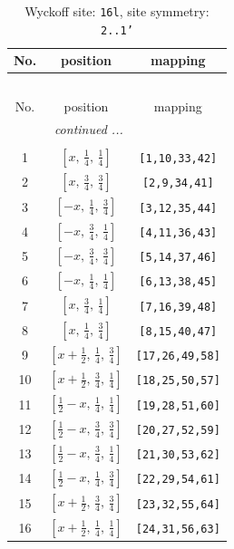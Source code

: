 \documentclass[fleqn,8pt]{jsarticle}
\begin{document}
\renewcommand{\arraystretch}{1.2}
\begin{longtable}{ccc}
\caption{Wyckoff site: {\tt 16l}, site symmetry: {\tt 2..1'}}
 \\
 \hline \hline
No. & position & mapping \\ \hline \endfirsthead

\multicolumn{2}{l}{\tablename\ \thetable{}} \\
 \hline \hline
No. & position & mapping \\ \hline \endhead

 \hline \hline
\multicolumn{2}{r}{\footnotesize\it continued ...} \\ \endfoot

 \hline \hline
\multicolumn{2}{r}{} \\ \endlastfoot

1 & $\left[ x,\, \frac{1}{4},\, \frac{1}{4} \right]$ & {\tt [1,10,33,42]} \\ \hline
2 & $\left[ x,\, \frac{3}{4},\, \frac{3}{4} \right]$ & {\tt [2,9,34,41]} \\ \hline
3 & $\left[ - x,\, \frac{1}{4},\, \frac{3}{4} \right]$ & {\tt [3,12,35,44]} \\ \hline
4 & $\left[ - x,\, \frac{3}{4},\, \frac{1}{4} \right]$ & {\tt [4,11,36,43]} \\ \hline
5 & $\left[ - x,\, \frac{3}{4},\, \frac{3}{4} \right]$ & {\tt [5,14,37,46]} \\ \hline
6 & $\left[ - x,\, \frac{1}{4},\, \frac{1}{4} \right]$ & {\tt [6,13,38,45]} \\ \hline
7 & $\left[ x,\, \frac{3}{4},\, \frac{1}{4} \right]$ & {\tt [7,16,39,48]} \\ \hline
8 & $\left[ x,\, \frac{1}{4},\, \frac{3}{4} \right]$ & {\tt [8,15,40,47]} \\ \hline
9 & $\left[ x + \frac{1}{2},\, \frac{1}{4},\, \frac{3}{4} \right]$ & {\tt [17,26,49,58]} \\ \hline
10 & $\left[ x + \frac{1}{2},\, \frac{3}{4},\, \frac{1}{4} \right]$ & {\tt [18,25,50,57]} \\ \hline
11 & $\left[ \frac{1}{2} - x,\, \frac{1}{4},\, \frac{1}{4} \right]$ & {\tt [19,28,51,60]} \\ \hline
12 & $\left[ \frac{1}{2} - x,\, \frac{3}{4},\, \frac{3}{4} \right]$ & {\tt [20,27,52,59]} \\ \hline
13 & $\left[ \frac{1}{2} - x,\, \frac{3}{4},\, \frac{1}{4} \right]$ & {\tt [21,30,53,62]} \\ \hline
14 & $\left[ \frac{1}{2} - x,\, \frac{1}{4},\, \frac{3}{4} \right]$ & {\tt [22,29,54,61]} \\ \hline
15 & $\left[ x + \frac{1}{2},\, \frac{3}{4},\, \frac{3}{4} \right]$ & {\tt [23,32,55,64]} \\ \hline
16 & $\left[ x + \frac{1}{2},\, \frac{1}{4},\, \frac{1}{4} \right]$ & {\tt [24,31,56,63]} \\
\end{longtable}
\end{document}
